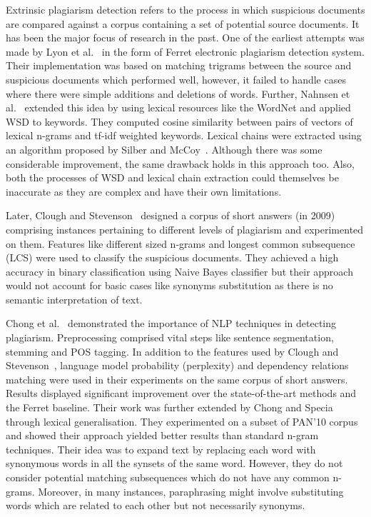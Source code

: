 \documentclass[11pt]{article}
\begin{document}
Extrinsic plagiarism detection refers to the process in which suspicious documents are compared against a corpus containing a set of potential source documents. It has been the major focus of research in the past. One of the earliest attempts was made by Lyon et al.~ in the form of Ferret electronic plagiarism detection system. Their implementation was based on matching trigrams between the source and suspicious documents which performed well, however, it failed to handle cases where there were simple additions and deletions of words.  Further, Nahnsen et al.~ extended this idea by using lexical resources like the WordNet and applied WSD to keywords. They computed cosine similarity between pairs of vectors of lexical n-grams and  tf-idf weighted keywords. Lexical chains were extracted using an algorithm proposed by Silber and McCoy~. Although there was some considerable improvement, the same drawback holds in this approach too. Also, both the processes of WSD and lexical chain extraction could themselves be inaccurate as they are complex and have their own limitations.

Later, Clough and Stevenson~ designed a corpus of short answers (in 2009) comprising instances pertaining to different levels of plagiarism and experimented on them. Features like different sized n-grams and longest common subsequence (LCS) were used to classify the suspicious documents. They achieved a high accuracy in binary classification using Naive Bayes classifier but their approach would not account for basic cases like synonyms substitution as there is no semantic interpretation of text.

Chong et al.~ demonstrated the importance of NLP techniques in detecting plagiarism. Preprocessing comprised vital steps like sentence segmentation, stemming and POS tagging. In addition to the features used by Clough and Stevenson~, language model probability (perplexity) and dependency relations matching were used in their experiments on the same corpus of short answers. Results displayed significant improvement over the state-of-the-art methods and the Ferret baseline. Their work was further extended by Chong and Specia~ through lexical generalisation. They experimented on a subset of PAN'10 corpus and showed their approach yielded better results than standard n-gram techniques. Their idea was to expand text by replacing each word with synonymous words in all the synsets of the same word. However, they do not consider potential matching subsequences which do not have any common n-grams. Moreover, in many instances, paraphrasing might involve substituting words which are related to each other but not necessarily synonyms.
\end{document}
